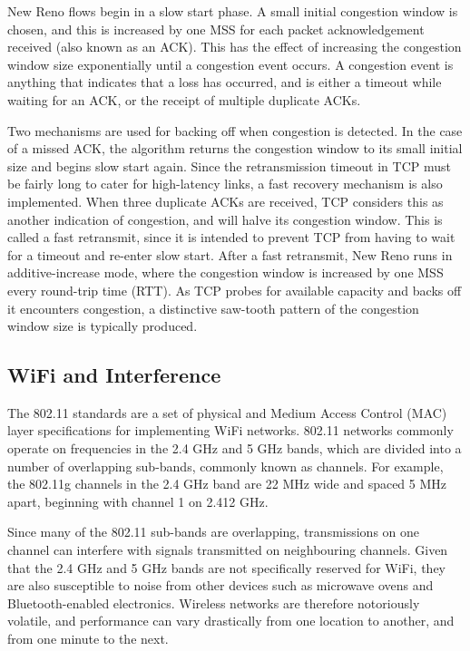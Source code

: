 New Reno flows begin in a slow start phase. A small initial congestion window
is chosen, and this is increased by one MSS for each packet acknowledgement
received (also known as an ACK). This has the effect of increasing the
congestion window size exponentially until a congestion event occurs. A
congestion event is anything that indicates that a loss has occurred, and is
either a timeout while waiting for an ACK, or the receipt of multiple
duplicate ACKs.

Two mechanisms are used for backing off when congestion is detected. In the
case of a missed ACK, the algorithm returns the congestion window to its small
initial size and begins slow start again. Since the retransmission timeout in TCP
must be
fairly long to cater for high-latency links, a fast recovery mechanism is also
implemented. When three duplicate ACKs are received, TCP considers this as another
indication of congestion, and will halve its congestion window. This is called a
fast retransmit, since it is intended to prevent TCP from having to wait for a
timeout and re-enter slow start. After a fast retransmit, New Reno runs in
additive-increase mode, where the congestion window is increased by one MSS
every round-trip time (RTT). As TCP probes for available capacity and backs off
it encounters congestion, a distinctive saw-tooth pattern of the congestion
window size is typically produced.

\subsection{WiFi and Interference}
\label{sec:bg:wifi}
The 802.11 standards are a set of physical and Medium Access Control (MAC) layer
specifications for
implementing WiFi networks. 802.11 networks commonly operate on frequencies in
the 2.4 GHz and 5 GHz bands, which are divided into a number of overlapping
sub-bands, commonly known as channels. For example, the 802.11g channels in
the 2.4 GHz band are 22 MHz wide and spaced 5 MHz apart, beginning with channel
1 on 2.412
GHz.

Since many of the 802.11 sub-bands are overlapping, transmissions on one channel
can interfere with signals transmitted on neighbouring channels. Given that the
2.4 GHz and 5 GHz bands are
not specifically reserved for WiFi, they are also susceptible to noise from
other devices such as microwave ovens and Bluetooth-enabled electronics.
Wireless networks are therefore notoriously volatile, and performance can vary
drastically from one location to another, and from one minute to the next.


